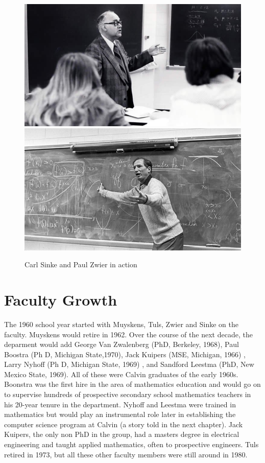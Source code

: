 \documentclass[
]{book}
\begin{document}
\begin{figure}

{\centering \includegraphics[width=0.5\linewidth]{images/sinke1} \includegraphics[width=0.5\linewidth]{images/zwier} 

}

\caption{Carl Sinke and Paul Zwier in action}\label{fig:sinkzwier}
\end{figure}

\hypertarget{faculty-growth}{%
\section{Faculty Growth}\label{faculty-growth}}

The 1960 school year started with Muyskens, Tuls, Zwier and Sinke on the faculty. Muyskens would retire in 1962.
Over the course of the next decade, the deparment would add George Van Zwalenberg (PhD, Berkeley, 1968), Paul Boostra (Ph D, Michigan State,1970), Jack Kuipers (MSE, Michigan, 1966) , Larry Nyhoff (Ph D, Michigan State, 1969) , and Sandford Leestma (PhD, New Mexico State, 1969). All of these were Calvin graduates of the early 1960s. Boonstra was the first hire in the area of mathematics education and would go on to supervise hundreds of prospective secondary school mathematics teachers in his 20-year tenure in the department. Nyhoff and Leestma were trained in mathematics but would play an instrumental role later in establishing the computer science program at Calvin (a story told in the next chapter). Jack Kuipers, the only non PhD in the group, had a masters degree in electrical engineering and taught applied mathematics, often to prospective engineers. Tuls retired in 1973, but all these other faculty members were still around in 1980.
\end{document}
